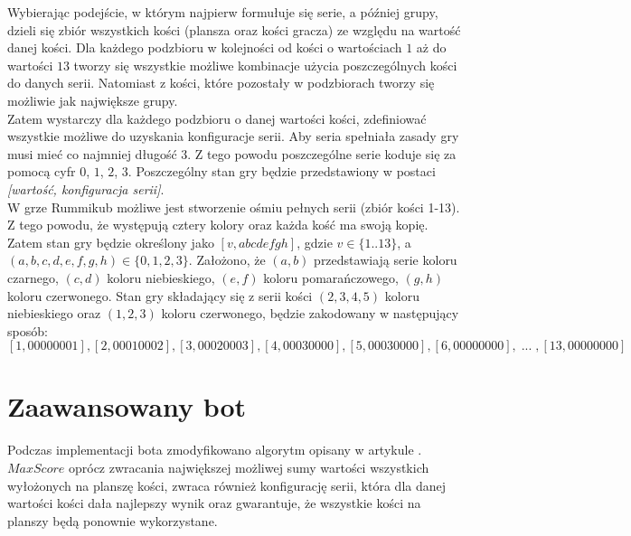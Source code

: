 Wybierając podejście, w którym najpierw formułuje się serie, a później grupy, dzieli się zbiór wszystkich kości (plansza oraz kości gracza) ze względu na wartość danej kości. Dla każdego podzbioru w kolejności od kości o wartościach $1$ aż do wartości $13$ tworzy się wszystkie możliwe kombinacje użycia poszczególnych kości do danych serii. Natomiast z kości, które pozostały w podzbiorach tworzy się możliwie jak największe grupy. \\

Zatem wystarczy dla każdego podzbioru o danej wartości kości, zdefiniować wszystkie możliwe do uzyskania konfiguracje serii. Aby seria spełniała zasady gry musi mieć co najmniej długość $3$. Z tego powodu poszczególne serie koduje się za pomocą cyfr $0$, $1$, $2$, $3$. Poszczególny stan gry będzie przedstawiony w postaci \emph{[wartość, konfiguracja serii]}. \\

W grze Rummikub możliwe jest stworzenie ośmiu pełnych serii (zbiór kości 1-13). Z tego powodu, że występują cztery kolory oraz każda kość ma swoją kopię. Zatem stan gry będzie określony jako $[v, abcdefgh]$, gdzie $v \in \{1..13\}$, a $(a, b, c, d, e, f, g, h) \in \{0, 1, 2, 3\}$. Założono, że $(a, b)$ przedstawiają serie koloru czarnego, $(c, d)$ koloru niebieskiego, $(e, f)$ koloru pomarańczowego, $(g, h)$ koloru czerwonego. Stan gry składający się z serii kości $(2, 3, 4, 5)$ koloru niebieskiego oraz $(1, 2, 3)$ koloru czerwonego, będzie zakodowany w następujący sposób: $$[1, 00000001], [2, 00010002], [3, 00020003], [4, 00030000], [5, 00030000], [6, 00000000], \;  ... \;, [13, 00000000]$$

\section{Zaawansowany bot}

Podczas implementacji bota zmodyfikowano algorytm opisany w artykule \cite{RummikubComplexity}. $MaxScore$ oprócz zwracania największej możliwej sumy wartości wszystkich wyłożonych na planszę kości, zwraca również konfigurację serii, która dla danej wartości kości dała najlepszy wynik oraz gwarantuje, że wszystkie kości na planszy będą ponownie wykorzystane. \\


